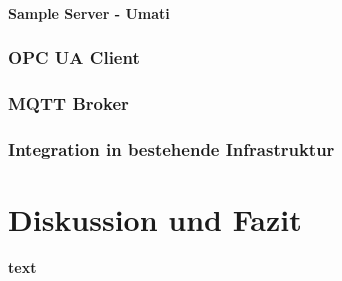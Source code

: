 \documentclass[a4paper, 12pt, oneside]{scrbook}
\begin{document}
			
			\subsubsection{Sample Server - Umati}			
			
			
			
		\subsection{OPC UA Client}
		\subsection{MQTT Broker}
			
		
		\subsection{Integration in bestehende Infrastruktur}
			

	
	
	\chapter{Diskussion und Fazit}\label{ch:Diskussion_Fazit}
	
	
	
	
	\frontmatter
	\printbibliography
	
	\textbf{text}
\end{document}
